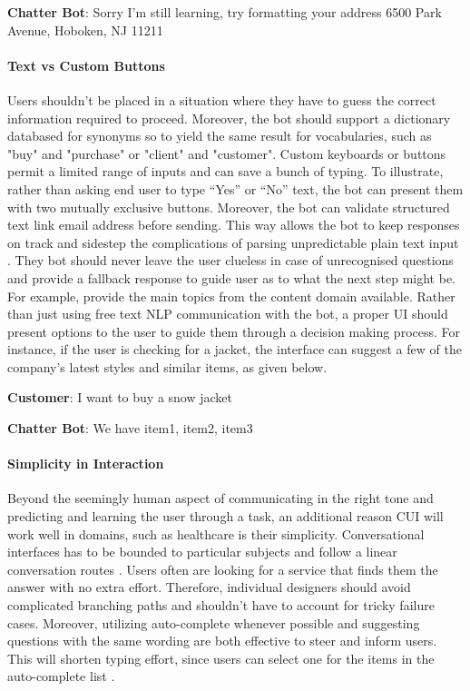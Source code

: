 { \selectfont

  \color{red}
  \textbf{Chatter Bot}:  Sorry I’m still learning, try formatting your address 6500 Park Avenue, Hoboken, NJ 11211
  \bigskip
  
  \color{black}
}

\paragraph{Text vs Custom Buttons}
Users shouldn’t be placed in a situation where they have to guess the correct information required to proceed. Moreover, the bot should support a dictionary databased for synonyms so to yield the same result for vocabularies, such as "buy" and "purchase" or "client" and "customer". Custom keyboards or buttons permit a limited range of inputs and can save a bunch of typing. To illustrate, rather than asking end user to type “Yes” or “No” text, the bot can present them with two mutually exclusive buttons. Moreover, the bot can validate structured text link email address before sending. This way allows the bot to keep responses on track and sidestep the complications of parsing unpredictable plain text input \cite{khan2018}. They bot should never leave the user clueless in case of unrecognised questions and provide a fallback response to guide user as to what the next step might be. For example, provide the main topics from the content domain available. Rather than just using free text NLP communication with the bot, a proper UI should present options to the user to guide them through a decision making process. For instance, if the user is checking for a jacket, the interface can suggest a few of the company’s latest styles and similar items, as given below.
\bigskip

{ \selectfont

  \color{blue}
  \textbf{Customer}: I want to buy a snow jacket
  \bigskip
  
  \color{red}
  \textbf{Chatter Bot}: We have item1, item2, item3
  \bigskip
  
  \color{black}
}

\paragraph{Simplicity in Interaction}
Beyond the seemingly human aspect of communicating in the right tone and predicting and learning the user through a task, an additional reason CUI will work well in domains, such as healthcare is their simplicity. Conversational interfaces has to be bounded to particular subjects and follow a linear conversation routes \cite{bers1998}. Users often are looking for a service that finds them the answer with no extra effort. Therefore, individual designers should avoid complicated branching paths and shouldn't have to account for tricky failure cases. Moreover, utilizing auto-complete whenever possible and suggesting questions with the same wording are both effective to steer and inform users. This will shorten typing effort, since users can select one for the items in the auto-complete list \cite{khan2018}.

